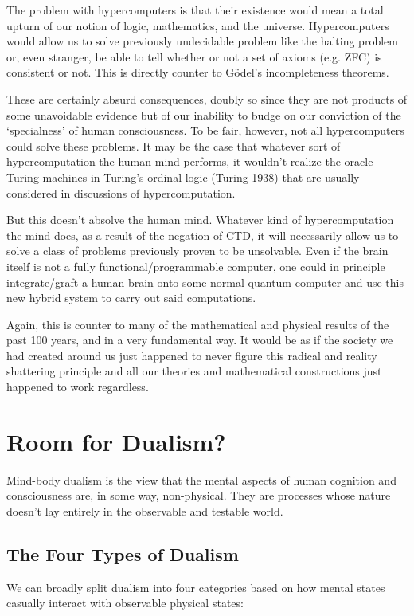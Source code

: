 \documentclass[11pt]{diazessay} %
\begin{document}
		The problem with hypercomputers is that their existence would mean a total upturn of our notion of logic, mathematics, and the universe. Hypercomputers would allow us to solve previously undecidable problem like the halting problem or, even stranger, be able to tell whether or not a set of axioms (e.g. ZFC) is consistent or not. This is directly counter to Gödel's incompleteness theorems.
		
		These are certainly absurd consequences, doubly so since they are not products of some unavoidable evidence but of our inability to budge on our conviction of the `specialness' of human consciousness. To be fair, however, not all hypercomputers could solve these problems. It may be the case that whatever sort of hypercomputation the human mind performs, it wouldn't realize the oracle Turing machines in Turing's ordinal logic (Turing 1938) that are usually considered in discussions of hypercomputation.
		
		But this doesn't absolve the human mind. Whatever kind of hypercomputation the mind does, as a result of the negation of CTD, it will necessarily allow us to solve a class of problems previously proven to be unsolvable. Even if the brain itself is not a fully functional/programmable computer, one could in principle integrate/graft a human brain onto some normal quantum computer and use this new hybrid system to carry out said computations.
		
		Again, this is counter to many of the mathematical and physical results of the past 100 years, and in a very fundamental way. It would be as if the society we had created around us just happened to never figure this radical and reality shattering principle and all our theories and mathematical constructions just happened to work regardless.


\section{Room for Dualism?}
	Mind-body dualism is the view that the mental aspects of human cognition and consciousness are, in some way, non-physical. They are processes whose nature doesn't lay entirely in the observable and testable world.
	\subsection{The Four Types of Dualism}
		We can broadly split dualism into four categories based on how mental states casually interact with observable physical states:
			
\end{document}
